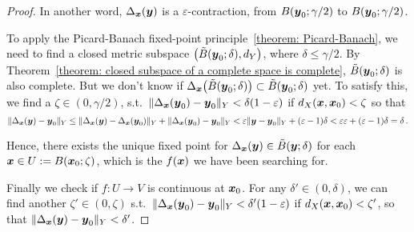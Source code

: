 \documentclass[openany]{book}
\begin{document}
\begin{proof}
	In another word, $\Delta_{\boldsymbol{x}} (\boldsymbol{y})$ is a $\varepsilon$-contraction, from $B(\boldsymbol{y}_0; \gamma/2)$ to $B(\boldsymbol{y}_0; \gamma/2)$. 
	
	To apply the Picard-Banach fixed-point principle~\ref{theorem: Picard-Banach}, we need to find a closed metric subspace $\big(\tilde{B}(\boldsymbol{y}_0; \delta), d_Y\big)$, where $\delta \leq \gamma/2$. By Theorem~\ref{theorem: closed subspace of a complete space is complete}, $\tilde{B}(\boldsymbol{y}_0; \delta)$ is also complete. 
	But we don't know if $\Delta_{\boldsymbol{x}}\big(\tilde{B}(\boldsymbol{y}_0; \delta)\big) \subset \tilde{B}(\boldsymbol{y}_0; \delta)$ yet. 
	To satisfy this, we find a $\zeta \in (0, \gamma/2)$, s.t.\ $\|\Delta_{\boldsymbol{x}}(\boldsymbol{y}_0) - \boldsymbol{y}_0\|_Y < \delta (1 - \varepsilon)$ if $d_X(\boldsymbol{x}, \boldsymbol{x}_0) < \zeta$ so that 
	\begin{equation*}
		\|\Delta_{\boldsymbol{x}}(\boldsymbol{y}) - \boldsymbol{y}_0\|_Y
			\leq \|\Delta_{\boldsymbol{x}}(\boldsymbol{y}) - \Delta_{\boldsymbol{x}}(\boldsymbol{y}_0)\|_Y 
				+ \|\Delta_{\boldsymbol{x}}(\boldsymbol{y}_0) - \boldsymbol{y}_0\|_Y 
			< \varepsilon \|\boldsymbol{y} - \boldsymbol{y}_0\|_Y + (\varepsilon - 1) \delta
			< \varepsilon \varepsilon + (\varepsilon - 1) \delta = \delta\,.
	\end{equation*}
	
	Hence, there exists the unique fixed point for $\Delta_{\boldsymbol{x}}(\boldsymbol{y}) \in \tilde B(\boldsymbol{y}; \delta)$ for each $\boldsymbol{x} \in U := B(\boldsymbol{x}_0; \zeta)$, which is the $f(\boldsymbol{x})$ we have been searching for.

	Finally we check if $f \colon U \to V$ is continuous at $\boldsymbol{x}_0$. 
	For any $\delta' \in (0, \delta)$, we can find another $\zeta' \in (0, \zeta)$ s.t.\ $\|\Delta_{\boldsymbol{x}}(\boldsymbol{y}_0) - \boldsymbol{y}_0\|_Y < \delta' (1 - \varepsilon)$ if $d_X(\boldsymbol{x}, \boldsymbol{x}_0) < \zeta'$, so that $\|\Delta_{\boldsymbol{x}}(\boldsymbol{y}) - \boldsymbol{y}_0\|_Y < \delta'$.
\end{proof}
\end{document}
